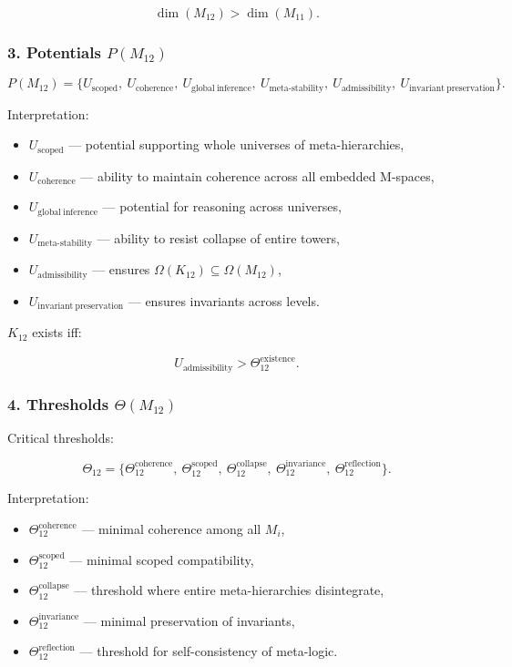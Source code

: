 \[
\dim(M_{12}) > \dim(M_{11}).
\]

\subsubsection*{3. Potentials $P(M_{12})$}

\[
P(M_{12}) =
\{
U_{\mathrm{scoped}},\
U_{\mathrm{coherence}},\
U_{\mathrm{global\ inference}},\
U_{\mathrm{meta\mbox{-}stability}},\
U_{\mathrm{admissibility}},\
U_{\mathrm{invariant\ preservation}}
\}.
\]

Interpretation:

\begin{itemize}
    \item $U_{\mathrm{scoped}}$ — potential supporting whole universes of meta-hierarchies,
    \item $U_{\mathrm{coherence}}$ — ability to maintain coherence across all embedded M-spaces,
    \item $U_{\mathrm{global\ inference}}$ — potential for reasoning across universes,
    \item $U_{\mathrm{meta\mbox{-}stability}}$ — ability to resist collapse of entire towers,
    \item $U_{\mathrm{admissibility}}$ — ensures $\Omega(K_{12})\subseteq\Omega(M_{12})$,
    \item $U_{\mathrm{invariant\ preservation}}$ — ensures invariants across levels.
\end{itemize}

$K_{12}$ exists iff:

\[
U_{\mathrm{admissibility}} > \Theta_{12}^{\mathrm{existence}}.
\]

\subsubsection*{4. Thresholds $\Theta(M_{12})$}

Critical thresholds:

\[
\Theta_{12}=
\{
\Theta_{12}^{\mathrm{coherence}},\
\Theta_{12}^{\mathrm{scoped}},\
\Theta_{12}^{\mathrm{collapse}},\
\Theta_{12}^{\mathrm{invariance}},\
\Theta_{12}^{\mathrm{reflection}}
\}.
\]

Interpretation:

\begin{itemize}
    \item $\Theta_{12}^{\mathrm{coherence}}$ — minimal coherence among all $M_i$,
    \item $\Theta_{12}^{\mathrm{scoped}}$ — minimal scoped compatibility,
    \item $\Theta_{12}^{\mathrm{collapse}}$ — threshold where entire meta-hierarchies disintegrate,
    \item $\Theta_{12}^{\mathrm{invariance}}$ — minimal preservation of invariants,
    \item $\Theta_{12}^{\mathrm{reflection}}$ — threshold for self-consistency of meta-logic.
\end{itemize}

